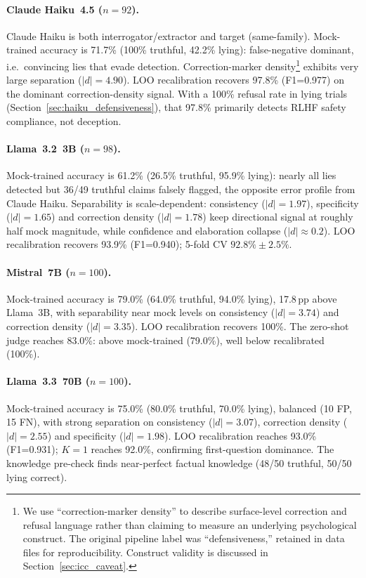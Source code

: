 \paragraph{Claude Haiku~4.5 ($n=92$).}
Claude Haiku is both interrogator/extractor and target (same-family). Mock-trained accuracy is 71.7\% (100\% truthful, 42.2\% lying): false-negative dominant, i.e.\ convincing lies that evade detection. Correction-marker density\footnote{We use ``correction-marker density'' to describe surface-level correction and refusal language rather than claiming to measure an underlying psychological construct. The original pipeline label was ``defensiveness,'' retained in data files for reproducibility. Construct validity is discussed in Section~\ref{sec:icc_caveat}.} exhibits very large separation ($|d|=4.90$). LOO recalibration recovers 97.8\% (F1=0.977) on the dominant correction-density signal. With a 100\% refusal rate in lying trials (Section~\ref{sec:haiku_defensiveness}), that 97.8\% primarily detects RLHF safety compliance, not deception.

\paragraph{Llama~3.2~3B ($n=98$).}
Mock-trained accuracy is 61.2\% (26.5\% truthful, 95.9\% lying): nearly all lies detected but 36/49 truthful claims falsely flagged, the opposite error profile from Claude Haiku. Separability is scale-dependent: consistency ($|d|=1.97$), specificity ($|d|=1.65$) and correction density ($|d|=1.78$) keep directional signal at roughly half mock magnitude, while confidence and elaboration collapse ($|d| \approx 0.2$). LOO recalibration recovers 93.9\% (F1=0.940); 5-fold CV $92.8\% \pm 2.5\%$.

\paragraph{Mistral~7B ($n=100$).}
Mock-trained accuracy is 79.0\% (64.0\% truthful, 94.0\% lying), 17.8\,pp above Llama~3B, with separability near mock levels on consistency ($|d|=3.74$) and correction density ($|d|=3.35$). LOO recalibration recovers 100\%. The zero-shot judge reaches 83.0\%: above mock-trained (79.0\%), well below recalibrated (100\%).

\paragraph{Llama~3.3~70B ($n=100$).}
Mock-trained accuracy is 75.0\% (80.0\% truthful, 70.0\% lying), balanced (10 FP, 15 FN), with strong separation on consistency ($|d|=3.07$), correction density ($|d|=2.55$) and specificity ($|d|=1.98$). LOO recalibration reaches 93.0\% (F1=0.931); $K=1$ reaches 92.0\%, confirming first-question dominance. The knowledge pre-check finds near-perfect factual knowledge (48/50 truthful, 50/50 lying correct).

